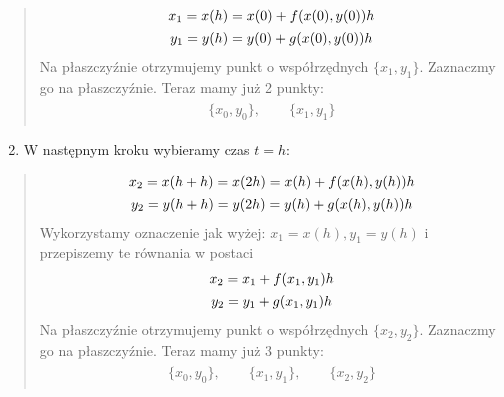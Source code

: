 \documentclass[a4paper,12pt,polish]{sphinxmanual}
\begin{document}
\begin{quote}
\label{ch1/chI021:equation-eqn39}\begin{gather}
\begin{split}x_1 =x(h) = x(0) + f(x(0), y(0)) h\end{split}\label{ch1/chI021-eqn39}\\\begin{split}y_1 = y(h) = y(0) + g(x(0), y(0)) h\end{split}\notag
\end{gather}
Na płaszczyźnie otrzymujemy punkt o współrzędnych $\{x_1, y_1\}$. Zaznaczmy go na płaszczyźnie. Teraz mamy już 2 punkty:
\label{ch1/chI021:equation-eqn41}\begin{gather}
\begin{split}\{x_0, y_0\}, \quad \quad \{x_1, y_1\}\end{split}\label{ch1/chI021-eqn41}
\end{gather}\end{quote}
\begin{enumerate}
\setcounter{enumi}{1}
\item {} 
W następnym kroku wybieramy czas $t=h$:

\end{enumerate}
\begin{quote}
\label{ch1/chI021:equation-eqn42}\begin{gather}
\begin{split}x_2 =x(h+h) = x(2h) =  x(h) + f(x(h), y(h)) h\end{split}\label{ch1/chI021-eqn42}\\\begin{split}y_2 = y(h+h) = y(2h) =  y(h) + g(x(h), y(h)) h\end{split}\notag
\end{gather}
Wykorzystamy oznaczenie jak wyżej: $x_1 =  x(h),  y_1 = y(h)$ i przepiszemy te równania w postaci
\label{ch1/chI021:equation-eqn43}\begin{gather}
\begin{split}x_2 =  x_1 + f(x_1, y_1) h\end{split}\label{ch1/chI021-eqn43}\\\begin{split}y_2 =  y_1 + g(x_1, y_1) h\end{split}\notag
\end{gather}
Na płaszczyźnie otrzymujemy punkt o współrzędnych $\{x_2, y_2\}$. Zaznaczmy go na płaszczyźnie. Teraz mamy już 3 punkty:
\label{ch1/chI021:equation-eqn45}\begin{gather}
\begin{split}\{x_0, y_0\}, \quad \quad \{x_1, y_1\},  \quad \quad \{x_2, y_2\}\end{split}\label{ch1/chI021-eqn45}
\end{gather}\end{quote}
\end{document}
